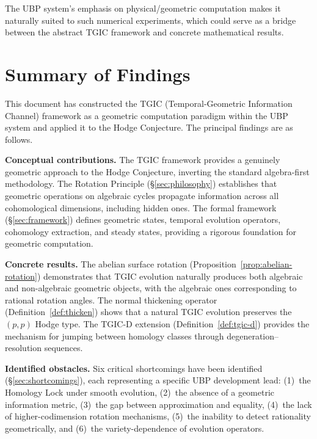 \documentclass[11pt,a4paper]{article}
\theoremstyle{definition}
\theoremstyle{plain}
\begin{document}
The UBP system's emphasis on physical/geometric computation makes it naturally suited to such numerical experiments, which could serve as a bridge between the abstract TGIC framework and concrete mathematical results.


\section{Summary of Findings}\label{sec:summary}

This document has constructed the TGIC (Temporal-Geometric Information Channel) framework as a geometric computation paradigm within the UBP system and applied it to the Hodge Conjecture. The principal findings are as follows.

\textbf{Conceptual contributions.} The TGIC framework provides a genuinely geometric approach to the Hodge Conjecture, inverting the standard algebra-first methodology. The Rotation Principle (\S\ref{sec:philosophy}) establishes that geometric operations on algebraic cycles propagate information across all cohomological dimensions, including hidden ones. The formal framework (\S\ref{sec:framework}) defines geometric states, temporal evolution operators, cohomology extraction, and steady states, providing a rigorous foundation for geometric computation.

\textbf{Concrete results.} The abelian surface rotation (Proposition~\ref{prop:abelian-rotation}) demonstrates that TGIC evolution naturally produces both algebraic and non-algebraic geometric objects, with the algebraic ones corresponding to rational rotation angles. The normal thickening operator (Definition~\ref{def:thicken}) shows that a natural TGIC evolution preserves the $(p,p)$ Hodge type. The TGIC-D extension (Definition~\ref{def:tgic-d}) provides the mechanism for jumping between homology classes through degeneration--resolution sequences.

\textbf{Identified obstacles.} Six critical shortcomings have been identified (\S\ref{sec:shortcomings}), each representing a specific UBP development lead: (1)~the Homology Lock under smooth evolution, (2)~the absence of a geometric information metric, (3)~the gap between approximation and equality, (4)~the lack of higher-codimension rotation mechanisms, (5)~the inability to detect rationality geometrically, and (6)~the variety-dependence of evolution operators.
\end{document}
